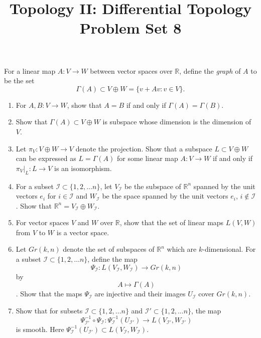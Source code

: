 \documentclass[12pt]{article}
\newcommand{\R}{\mathbb{R}}
\newcommand{\I}{\mathcal{I}}
\begin{document}
\title{Topology II: Differential Topology\\
Problem Set 8} 
\date{}
\maketitle



For a linear map $A:V\to W$ between vector spaces over $\R$, define the \emph{graph} of $A$ to be the set
$$\Gamma(A)\subset V\oplus W=\{v+Av:v\in V\}.$$

\begin{enumerate}

\item For $A,B:V\to W$, show that $A=B$ if and only if $\Gamma(A)=\Gamma(B)$.

\item Show that $\Gamma(A)\subset V\oplus W$ is subspace whose dimension is the dimension of $V$.

\item  Let $\pi_V:V\oplus W\to V$ denote the projection. Show that a subspace $L\subset V\oplus W$ can be expressed as $L=\Gamma(A)$ for some linear map $A:V\to W$ if and only if $\pi_V\vert_L:L\to V$ is an isomorphism.

\item For a subset $\I\subset\{1,2,\dots n\}$, let $V_{\I}$ be the subspace of $\R^n$ spanned by the unit vectors $e_i$ for $i\in \I$ and $W_{\I}$ be the space spanned by the unit vectors $e_i$, $i\notin \I$. Show that $\R^n=V_{\I}\oplus W_{\I}$.

\item For vector spaces $V$ and $W$ over $\R$, show that the set of linear maps $L(V,W)$ from $V$ to $W$ is a vector space.

\item Let $Gr(k,n)$ denote the set of subspaces of $\R^n$ which are $k$-dimensional. For a subset $\I\subset\{1,2,\dots n\}$, define the map $$\Psi_{\I}:L(V_{\I},W_{\I})\to Gr(k,n)$$ 
by 
$$A\mapsto \Gamma(A)$$. 
Show that the maps $\Psi_{\I}$ are injective and their images $U_{\I}$ cover $Gr(k,n)$.

\item Show that for subsets $\I\subset\{1,2,\dots n\}$ and $\I'\subset\{1,2,\dots n\}$, the map 
$$\Psi^{-1}_{\I'}\circ\Psi_{\I}: \Psi^{-1}_{\I}(U_{\I'})\to L(V_{\I'},W_{\I'})$$ 
is smooth. Here $\Psi^{-1}_{\I}(U_{\I'})\subset L(V_{\I},W_{\I})$.
\end{enumerate}
\end{document}
